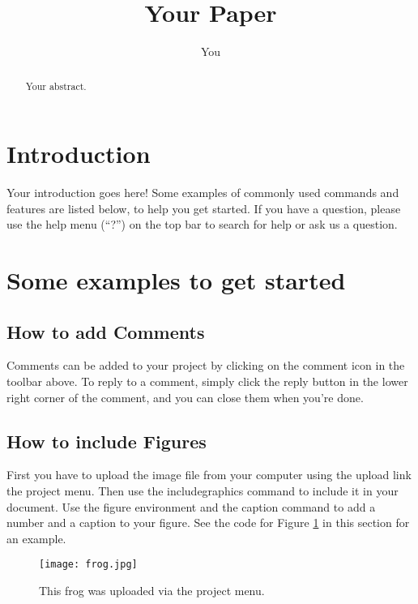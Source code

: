 \documentclass[a4paper]{article}
\title{Your Paper}
\author{You}
\begin{document}
    \maketitle

    \begin{abstract}
    Your abstract.
    \end{abstract}

    \section{Introduction}

    Your introduction goes here! Some examples of commonly used commands and features are listed below, to help you get started. If you have a question, please use the help menu (``?'') on the top bar to search for help or ask us a question.

    \section{Some examples to get started}

    \subsection{How to add Comments}

    Comments can be added to your project by clicking on the comment icon in the toolbar above. %
    To reply to a comment, simply click the reply button in the lower right corner of the comment, and you can close them when you're done.

    \subsection{How to include Figures}

    First you have to upload the image file from your computer using the upload link the project menu. Then use the includegraphics command to include it in your document. Use the figure environment and the caption command to add a number and a caption to your figure. See the code for Figure \ref{fig:frog} in this section for an example.

    \begin{figure}
    \centering
    \texttt{[image: frog.jpg]}
    \caption{\label{fig:frog}This frog was uploaded via the project menu.}
    \end{figure}
\end{document}
